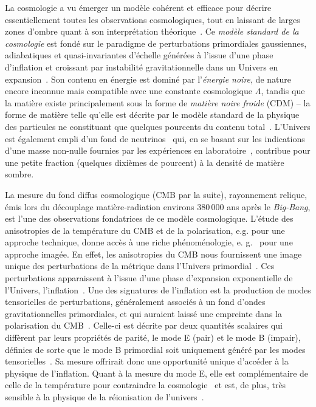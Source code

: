

La cosmologie a vu émerger un modèle cohérent et efficace
pour décrire essentiellement toutes les observations cosmologiques,
tout en laissant de larges zones d'ombre quant à son interprétation
théorique~. Ce \emph{modèle standard de la cosmologie} est
fondé sur le paradigme de perturbations primordiales gaussiennes,
adiabatiques et quasi-invariantes d'échelle générées à l'issue d'une
phase d'inflation et croissant par instabilité gravitationnelle dans
un Univers en expansion~. Son contenu en énergie est
dominé par l'\emph{énergie noire}, de nature encore inconnue mais
compatible avec une constante cosmologique $\Lambda$, tandis
que la matière existe principalement sous la forme de
\emph{matière noire froide} (CDM) -- la forme de matière telle qu'elle
est décrite par le modèle standard de la physique des particules ne
constituant que quelques pourcents du contenu
total~. L'Univers est également empli d'un fond de
neutrinos~ qui, en se basant sur les indications d'une
masse non-nulle fournies par les expériences en laboratoire~,
contribue pour une petite fraction (quelques dixièmes de pourcent) à
la densité de matière sombre.

La mesure du fond diffus cosmologique (CMB par la suite), rayonnement
relique, émis lors du découplage matière-radiation environs 380\,000
ans après le \emph{Big-Bang}, est l'une des observations fondatrices
de ce modèle cosmologique. L'étude des anisotropies de la température
du CMB et de la polarisation, e.g.  pour
une approche technique, donne accès à une riche phénoménologie,
e. g.~ pour une approche imagée. En effet, les
anisotropies du CMB nous fournissent une image unique des
perturbations de la métrique dans
l'Univers primordial~. Ces perturbations
apparaissent à l'issue d'une phase d'expansion exponentielle de
l'Univers, l'inflation~. Une des signatures de
l'inflation est la production de modes tensorielles de perturbations,
généralement associés à un fond d'ondes gravitationnelles
primordiales, et qui auraient laissé une empreinte dans la
polarisation du CMB~. Celle-ci est décrite par deux
quantités scalaires qui diffèrent par leurs propriétés de parité, le
mode E (pair) et le mode B (impair), définies de sorte que le mode B
primordial soit uniquement généré par les modes
tensorielles~. Sa mesure offrirait donc une
opportunité unique d'accéder à la physique de l'inflation. Quant à la
mesure du mode E, elle est complémentaire de celle de la température
pour contraindre la cosmologie~ et est, de plus, très sensible
à la physique de la réionisation de l'univers~.

